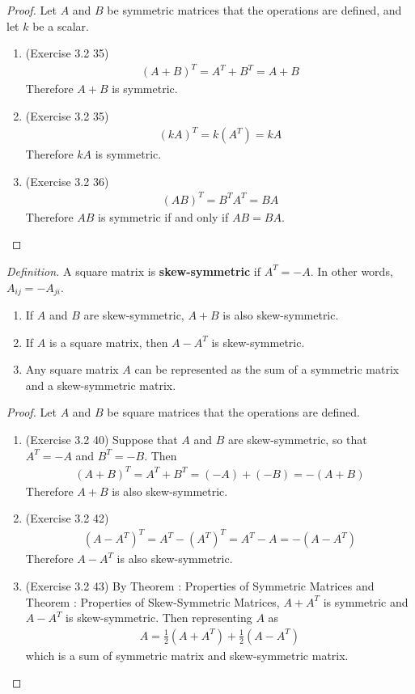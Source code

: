 \begin{proof}
	Let $A$ and $B$ be symmetric matrices that the operations are defined, and let $k$ be a scalar.
	\begin{enumerate}
		\item (Exercise 3.2 35)
		\begin{align*}
		(A+B)^{T} = A^{T} + B^{T} = A+B
		\end{align*} Therefore $A+B$ is symmetric.
		\item (Exercise 3.2 35)
		\begin{align*}
		(kA)^{T} = k(A^{T}) = kA
		\end{align*} Therefore $kA$ is symmetric.
		\item (Exercise 3.2 36)
		\begin{align*}
		(AB)^{T} = B^{T}A^{T} = BA
		\end{align*} Therefore $AB$ is symmetric if and only if $AB = BA$.
	\end{enumerate}
\end{proof}
\noindent \textit{Definition.} A square matrix is \textbf{skew-symmetric} if $A^T = -A$. In other words, $A_{ij} = -A_{ji}$.
\begin{plaintheorem}
	\begin{enumerate}
		\item If $A$ and $B$ are skew-symmetric, $A+B$ is also skew-symmetric.
		\item If $A$ is a square matrix, then $A-A^T$ is skew-symmetric.
		\item Any square matrix $A$ can be represented as the sum of a symmetric matrix and a skew-symmetric matrix.
	\end{enumerate}
\end{plaintheorem}


\begin{proof}
	Let $A$ and $B$ be square matrices that the operations are defined.
	\begin{enumerate}
		\item (Exercise 3.2 40) Suppose that $A$ and $B$ are skew-symmetric, so that $A^T = -A$ and $B^T = -B$. Then
		\begin{align*}
		(A+B)^T = A^T + B^T = (-A) + (-B) = -(A+B)
		\end{align*} Therefore $A+B$ is also skew-symmetric.
		\item (Exercise 3.2 42)
		\begin{align*}
		(A - A^T)^T = A^T - (A^T)^T = A^T - A = -(A - A^T)
		\end{align*} Therefore $A - A^T$ is also skew-symmetric.
		\item (Exercise 3.2 43) By Theorem : Properties of Symmetric Matrices and Theorem : Properties of Skew-Symmetric Matrices, $A + A^T$ is symmetric and $A - A^T$ is skew-symmetric. Then representing $A$ as
		\begin{align*}
		A = \frac{1}{2}(A + A^T) + \frac{1}{2}(A - A^T)
		\end{align*} which is a sum of symmetric matrix and skew-symmetric matrix.
	\end{enumerate}
\end{proof}

